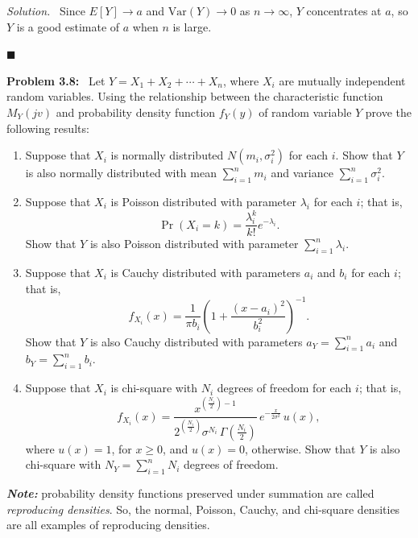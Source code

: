 \documentclass[11pt]{article}
\newenvironment{problem}[1]
{\par\bigskip\noindent\textbf{Problem #1:}\ }
{\par}
\newenvironment{solution}
{\par\medskip\noindent\textit{Solution.}\ }
{\hfill$\blacksquare$\par\medskip}
\begin{document}
\begin{solution}
        Since $E[Y] \to a$ and $\mathrm{Var}(Y) \to 0$ as $n \to \infty$, $Y$ concentrates
        at $a$, so $Y$ is a good estimate of $a$ when $n$ is large.

    \end{solution}

    \begin{problem}{3.8}
Let $Y = X_1 + X_2 + \cdots + X_n$, where $X_i$ are mutually independent random
variables. Using the relationship between the characteristic function $M_Y(jv)$
and probability density function $f_Y(y)$ of random variable $Y$ prove the
following results:
\begin{enumerate}[label=(\alph*)]
  \item Suppose that $X_i$ is normally distributed $N(m_i, \sigma_i^2)$ for each $i$.
  Show that $Y$ is also normally distributed with mean $\sum_{i=1}^n m_i$
  and variance $\sum_{i=1}^n \sigma_i^2$.
  \item Suppose that $X_i$ is Poisson distributed with parameter $\lambda_i$ for
  each $i$; that is,
  \[
      \Pr(X_i = k) = \frac{\lambda_i^k}{k!}e^{-\lambda_i}.
  \]
  Show that $Y$ is also Poisson distributed with parameter
  $\sum_{i=1}^n \lambda_i$.
  \item Suppose that $X_i$ is Cauchy distributed with parameters $a_i$ and $b_i$
  for each $i$; that is,
  \[
      f_{X_i}(x) = \frac{1}{\pi b_i}\left(1 + \frac{(x - a_i)^2}{b_i^2}\right)^{-1}.
  \]
  Show that $Y$ is also Cauchy distributed with parameters
  $a_Y = \sum_{i=1}^n a_i$ and $b_Y = \sum_{i=1}^n b_i$.
  \item Suppose that $X_i$ is chi-square with $N_i$ degrees of freedom for each
  $i$; that is,
  \[
      f_{X_i}(x) = \frac{x^{\left(\frac{N_i}{2}\right)-1}}
      {2^{\left(\frac{N_i}{2}\right)}\sigma^{N_i}\,\Gamma\!\left(\frac{N_i}{2}\right)}
      \, e^{-\frac{x}{2\sigma^2}}\, u(x),
  \]
  where $u(x) = 1$, for $x \ge 0$, and $u(x) = 0$, otherwise. Show that $Y$
  is also chi-square with $N_Y = \sum_{i=1}^n N_i$ degrees of freedom.
\end{enumerate}
\textbf{\textit{Note:}} probability density functions preserved under summation
are called \emph{reproducing densities}. So, the normal, Poisson, Cauchy, and
chi-square densities are all examples of reproducing densities.
    \end{problem}
\end{document}
